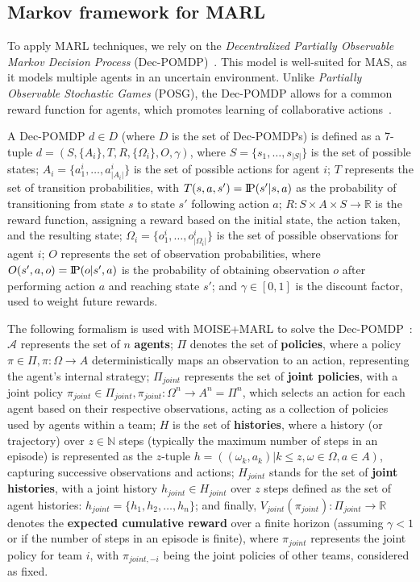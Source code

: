 \documentclass[sigconf,anonymous]{aamas}
\newcommand{\probP}{\text{I\kern-0.15em P}}
\begin{document}
\subsection{Markov framework for MARL}

To apply MARL techniques, we rely on the \textit{Decentralized Partially Observable Markov Decision Process} (Dec-POMDP)~\citep{Oliehoek2016}. This model is well-suited for MAS, as it models multiple agents in an uncertain environment. Unlike \textit{Partially Observable Stochastic Games} (POSG), the Dec-POMDP allows for a common reward function for agents, which promotes learning of collaborative actions~\citep{Beynier2013}.

A Dec-POMDP $d \in D$ (where $D$ is the set of Dec-POMDPs) is defined as a 7-tuple $d = (S, \{A_i\}, T, R, \{\Omega_i\}, O, \gamma)$, where $S = \{s_1,\dots,s_{|S|}\}$ is the set of possible states; $A_{i} = \{a_{1}^{i},\dots,a_{|A_{i}|}^{i}\}$ is the set of possible actions for agent $i$; $T$ represents the set of transition probabilities, with $T(s,a,s') = \probP(s'|s,a)$ as the probability of transitioning from state $s$ to state $s'$ following action $a$; $R: S \times A \times S \rightarrow \mathbb{R}$ is the reward function, assigning a reward based on the initial state, the action taken, and the resulting state; $\Omega_{i} = \{o_{1}^{i},\dots,o_{|\Omega_{i}|}^{i}\}$ is the set of possible observations for agent $i$; $O$ represents the set of observation probabilities, where $O(s',a,o) = \probP(o|s',a)$ is the probability of obtaining observation $o$ after performing action $a$ and reaching state $s'$; and $\gamma \in [0,1]$ is the discount factor, used to weight future rewards.


The following formalism is used with MOISE+MARL to solve the Dec-POMDP~\citep{Beynier2013,Albrecht2024}: $\mathcal{A}$ represents the set of $n$ \textbf{agents}; $\Pi$ denotes the set of \textbf{policies}, where a policy $\pi \in \Pi, \pi: \Omega \rightarrow A$ deterministically maps an observation to an action, representing the agent's internal strategy; $\Pi_{joint}$ represents the set of \textbf{joint policies}, with a joint policy $\pi_{joint} \in \Pi_{joint}, \pi_{joint}: \Omega^n \rightarrow A^n = \Pi^n$, which selects an action for each agent based on their respective observations, acting as a collection of policies used by agents within a team; $H$ is the set of \textbf{histories}, where a history (or trajectory) over $z \in \mathbb{N}$ steps (typically the maximum number of steps in an episode) is represented as the $z$-tuple $h = ((\omega_{k}, a_{k}) | k \leq z, \omega \in \Omega, a \in A)$, capturing successive observations and actions; $H_{joint}$ stands for the set of \textbf{joint histories}, with a joint history $h_{joint} \in H_{joint}$ over $z$ steps defined as the set of agent histories: $h_{joint} = \{h_1, h_2, \dots, h_n\}$; and finally, $V_{joint}(\pi_{joint}): \Pi_{joint} \rightarrow \mathbb{R}$ denotes the \textbf{expected cumulative reward} over a finite horizon (assuming $\gamma < 1$ or if the number of steps in an episode is finite), where $\pi_{joint}$ represents the joint policy for team $i$, with $\pi_{joint,-i}$ being the joint policies of other teams, considered as fixed.
\end{document}

